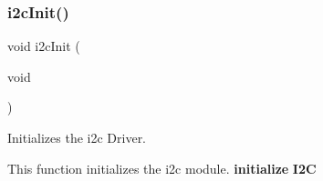 \subsubsection{\texorpdfstring{i2c\+Init()}{i2cInit()}}
{\footnotesize\ttfamily void i2c\+Init (\begin{DoxyParamCaption}\item[{void}]{ }\end{DoxyParamCaption})}



Initializes the i2c Driver. 

This function initializes the i2c module. {\bfseries initialize} {\bfseries I2C} ~\newline
~\newline
~\newline
~\newline
~\newline
~\newline
~\newline
~\newline
~\newline
~\newline
~\newline
~\newline
~\newline
~\newline
~\newline
~\newline
~\newline

